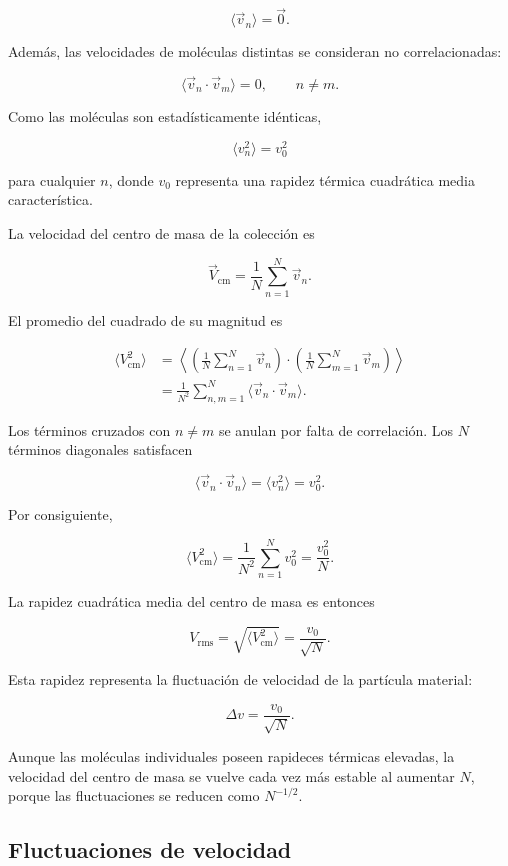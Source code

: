 $$
\langle\vec{v}_n\rangle=\vec{0}.
$$

Además, las velocidades de moléculas distintas se consideran no
correlacionadas:

$$
\langle\vec{v}_n\cdot\vec{v}_m\rangle=0,
\qquad n\neq m.
$$

Como las moléculas son estadísticamente idénticas,

$$
\langle v_n^2\rangle=v_0^2
$$

para cualquier $n$, donde $v_0$ representa una rapidez térmica cuadrática
media característica.

La velocidad del centro de masa de la colección es

$$
\vec{V}_{\mathrm{cm}}
=\frac{1}{N}\sum_{n=1}^{N}\vec{v}_n.
$$

El promedio del cuadrado de su magnitud es

$$
\begin{aligned}
\langle V_{\mathrm{cm}}^2\rangle
&=\left\langle
\left(\frac{1}{N}\sum_{n=1}^{N}\vec{v}_n\right)
\cdot
\left(\frac{1}{N}\sum_{m=1}^{N}\vec{v}_m\right)
\right\rangle\\
&=\frac{1}{N^2}
\sum_{n,m=1}^{N}
\langle\vec{v}_n\cdot\vec{v}_m\rangle.
\end{aligned}
$$

Los términos cruzados con $n\neq m$ se anulan por falta de correlación. Los
$N$ términos diagonales satisfacen

$$
\langle\vec{v}_n\cdot\vec{v}_n\rangle
=\langle v_n^2\rangle
=v_0^2.
$$

Por consiguiente,

$$
\langle V_{\mathrm{cm}}^2\rangle
=\frac{1}{N^2}\sum_{n=1}^{N}v_0^2
=\frac{v_0^2}{N}.
$$

La rapidez cuadrática media del centro de masa es entonces

$$
\boxed{
V_{\mathrm{rms}}
=\sqrt{\langle V_{\mathrm{cm}}^2\rangle}
=\frac{v_0}{\sqrt{N}}
}.
$$

Esta rapidez representa la fluctuación de velocidad de la partícula material:

$$
\boxed{
\Delta v=\frac{v_0}{\sqrt{N}}
}.
$$

Aunque las moléculas individuales poseen rapideces térmicas elevadas, la
velocidad del centro de masa se vuelve cada vez más estable al aumentar $N$,
porque las fluctuaciones se reducen como $N^{-1/2}$.


\subsection{Fluctuaciones de velocidad}

